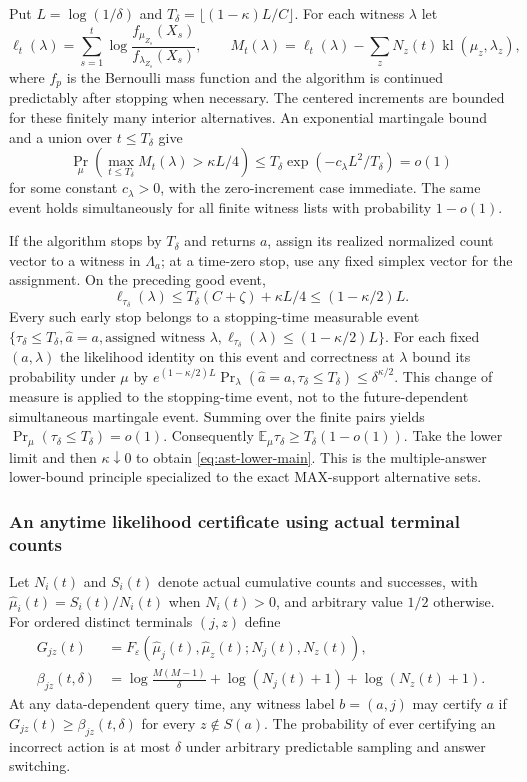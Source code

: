 \documentclass{article}
\theoremstyle{plain}
\theoremstyle{definition}
\begin{document}
Put $L=\log(1/\delta)$ and
$T_\delta=\lfloor(1-\kappa)L/C\rfloor$.  For each witness $\lambda$ let
\[
 \ell_t(\lambda)=\sum_{s=1}^t
   \log\frac{f_{\mu_{Z_s}}(X_s)}{f_{\lambda_{Z_s}}(X_s)},\qquad
 M_t(\lambda)=\ell_t(\lambda)-\sum_zN_z(t)\operatorname{kl}(\mu_z,\lambda_z),
\]
where $f_p$ is the Bernoulli mass function and the algorithm is continued
predictably after stopping when necessary.  The centered increments are
bounded for these finitely many interior alternatives.  An exponential
martingale bound and a union over $t\le T_\delta$ give
\[
 \Pr_\mu\!\left(\max_{t\le T_\delta}M_t(\lambda)>\kappa L/4\right)
 \le T_\delta\exp(-c_\lambda L^2/T_\delta)=o(1)
\]
for some constant $c_\lambda>0$, with the zero-increment case immediate.
The same event holds simultaneously for all finite witness lists with
probability $1-o(1)$.

If the algorithm stops by $T_\delta$ and returns $a$, assign its realized
normalized count vector to a witness in $\Lambda_a$; at a time-zero stop,
use any fixed simplex vector for the assignment.  On the preceding
good event,
\[
 \ell_{\tau_\delta}(\lambda)
 \le T_\delta(C+\zeta)+\kappa L/4
 \le(1-\kappa/2)L.
\]
Every such early stop belongs to a stopping-time measurable event
$\{\tau_\delta\le T_\delta,\widehat a=a,\text{assigned witness }\lambda,
\ell_{\tau_\delta}(\lambda)\le(1-\kappa/2)L\}$.
For each fixed $(a,\lambda)$ the likelihood identity on this event and
correctness at $\lambda$ bound its probability under $\mu$ by
$e^{(1-\kappa/2)L}\Pr_\lambda(\widehat a=a,\tau_\delta\le T_\delta)
\le\delta^{\kappa/2}$.
This change of measure is applied to the stopping-time event, not to the
future-dependent simultaneous martingale event.
Summing over the finite pairs yields
$\Pr_\mu(\tau_\delta\le T_\delta)=o(1)$.
Consequently $\mathbb E_\mu\tau_\delta\ge T_\delta(1-o(1))$.
Take the lower limit and then $\kappa\downarrow0$ to obtain
\eqref{eq:ast-lower-main}.  This is the multiple-answer lower-bound principle
specialized to the exact MAX-support alternative sets.

\subsubsection{An anytime likelihood certificate using actual terminal counts}
\label{app:ast-pair-certificate}
Let $N_i(t)$ and $S_i(t)$ denote actual cumulative counts and successes,
with $\widehat\mu_i(t)=S_i(t)/N_i(t)$ when $N_i(t)>0$, and arbitrary value
$1/2$ otherwise.  For ordered distinct terminals $(j,z)$ define
\begin{align}
 G_{jz}(t)&=F_\varepsilon(\widehat\mu_j(t),\widehat\mu_z(t);N_j(t),N_z(t)),
 \label{eq:ast-glr}\\
 \beta_{jz}(t,\delta)&=
 \log\frac{M(M-1)}{\delta}+\log(N_j(t)+1)+\log(N_z(t)+1).
 \label{eq:ast-threshold}
\end{align}
At any data-dependent query time, any witness label $b=(a,j)$ may certify
$a$ if $G_{jz}(t)\ge\beta_{jz}(t,\delta)$ for every $z\notin S(a)$.
The probability of ever certifying an incorrect action is at most $\delta$
under arbitrary predictable sampling and answer switching.
\end{document}
